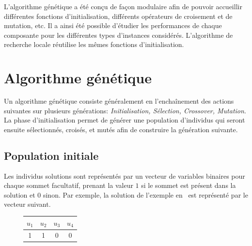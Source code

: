 \documentclass[10pt]{article}
\begin{document}
	L'algorithme génétique a été conçu de façon modulaire afin de pouvoir accueillir différentes fonctions d'initialisation, différents opérateurs de croisement et de mutation, etc. Il a ainsi été possible d'étudier les performances de chaque composante pour les différentes types d'instances considérés. L'algorithme de recherche locale réutilise les mêmes fonctions d'initialisation.
	
\section{Algorithme génétique}
	Un algorithme génétique consiste généralement en l'enchaînement des actions suivantes sur plusieurs générations: \textit{Initialisation, Sélection, Crossover, Mutation}. La phase d'initialisation permet de générer une population d'individus qui seront ensuite sélectionnés, croisés, et mutés afin de construire la génération suivante.

	\subsection{Population initiale}
		Les individus solutions sont représentés par un vecteur de variables binaires pour chaque sommet facultatif, prenant la valeur $1$ si le sommet est présent dans la solution et 0 sinon. Par exemple, la solution de l'exemple en~ est représenté par le vecteur suivant.
		\begin{figure}[h!]
			\centering
			\begin{tabular}{|c|c|c|c|}
				\hline
				$u_1$ & $u_2$ & $u_3$ & $u_4$ \\
				\hline
				1 & 1 & 0 & 0 \\
				\hline
			\end{tabular}
		\end{figure}
	
\end{document}
